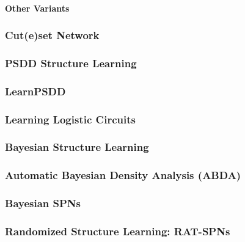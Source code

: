 				\paragraph{Other Variants} %

			\subsubsection{Cut(e)set Network} %

			\subsubsection{PSDD Structure Learning} %

			\subsubsection{LearnPSDD} %

			\subsubsection{Learning Logistic Circuits} %

			\subsubsection{Bayesian Structure Learning} %

			\subsubsection{Automatic Bayesian Density Analysis (ABDA)} %

			\subsubsection{Bayesian SPNs} %

			\subsubsection{Randomized Structure Learning: RAT-SPNs} %

